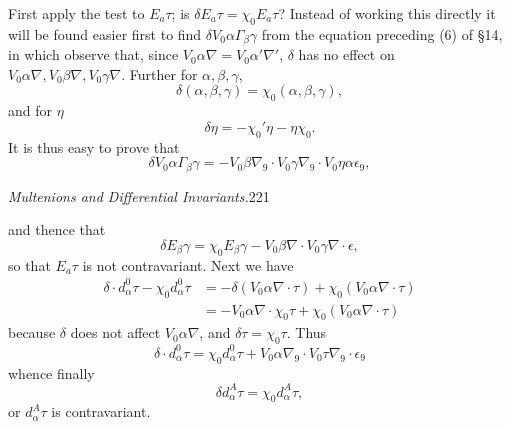 \documentclass[11pt]{article}
\begin{document}
\indent First apply the test to $E_a\tau$; is $\delta E_a\tau=\chi_0E_a\tau$? Instead of working this directly it will be found easier first to find $\delta V_0\alpha\Gamma_\beta\gamma$ from the equation preceding (6) of §14, in which observe that, since $V_0\alpha\nabla=V_0\alpha'\nabla'$, $\delta$ has no effect on $V_0\alpha\nabla,V_0\beta\nabla,V_0\gamma\nabla$. Further for $\alpha,\beta,\gamma$,
\[
\delta(\alpha,\beta,\gamma)=\chi_0(\alpha,\beta,\gamma),
\]
and for $\eta$
\[
\delta\eta=-\chi_0'\eta-\eta\chi_0.
\]
It is thus easy to prove that
\[
\delta V_0\alpha\Gamma_\beta\gamma=-V_0\beta\nabla_9\cdot V_0\gamma\nabla_9\cdot V_0\eta\alpha\epsilon_9,
\]
\newpage\thispagestyle{empty}\begin{center}\textit{Multenions and Differential Invariants.}\hfill 221\end{center}
and thence that
\begin{equation}\delta E_\beta\gamma=\chi_0E_\beta\gamma-V_0\beta\nabla\cdot V_0\gamma\nabla\cdot\epsilon,\tag{4}\end{equation}
so that $E_a\tau$ is not contravariant. Next we have
\[
\begin{aligned}
\delta\cdot d_{\alpha}^{0}\tau-\chi_0d_{\alpha}^{0}\tau&=-\delta(V_0\alpha\nabla\cdot\tau)+\chi_0(V_0\alpha\nabla\cdot\tau)\\
&=-V_0\alpha\nabla\cdot\chi_0\tau+\chi_0(V_0\alpha\nabla\cdot\tau)
\end{aligned}
\]
because $\delta$ does not affect $V_0\alpha\nabla$, and $\delta\tau=\chi_0\tau$. Thus
\[
\delta\cdot d_{\alpha}^{0}\tau=\chi_0d_{\alpha}^{0}\tau+V_0\alpha\nabla_9\cdot V_0\tau\nabla_9\cdot\epsilon_9
\]
whence finally
\[
\delta d_{\alpha}^{A}\tau=\chi_0d_{\alpha}^{A}\tau,
\]
or $d_{\alpha}^{A}\tau$ is contravariant.
\end{document}
